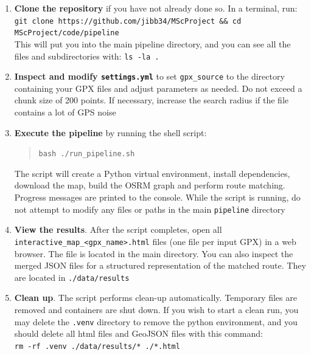\documentclass[11pt,a4paper]{article}
\begin{document}
\begin{enumerate}
	\item \textbf{Clone the repository} if you have not already done so.  In a terminal, run:\\
	      \texttt{\small git clone https://github.com/jibb34/MScProject \&\& cd MScProject/code/pipeline}\\
	      This will put you into the main pipeline directory, and you can see all the files and subdirectories with: \texttt{ls -la .}
	\item \textbf{Inspect and modify \texttt{settings.yml}} to set \texttt{gpx\_source} to the directory containing your GPX files and adjust parameters as needed.  Do not exceed a chunk size of 200 points.  If necessary, increase the search radius if the file contains a lot of GPS noise
	\item \textbf{Execute the pipeline} by running the shell script:
	      \begin{quote}
		      \texttt{bash ./run\_pipeline.sh}
	      \end{quote}
	      The script will create a Python virtual environment, install dependencies, download the map, build the OSRM graph and perform route matching.  Progress messages are printed to the console. While the script is running, do not attempt to modify any files or paths in the main \texttt{pipeline} directory
	\item \textbf{View the results}.  After the script completes, open all \texttt{\small interactive\_map\_\textless gpx\_name\textgreater{}.html} files (one file per input GPX) in a web browser.  The file is located in the main directory.  You can also inspect the merged JSON files for a structured representation of the matched route. They are located in \texttt{./data/results}
	\item \textbf{Clean up}.  The script performs clean-up automatically. Temporary files are removed and containers are shut down. If you wish to start a clean run, you may delete the \texttt{.venv} directory to remove the python environment, and you should delete all html files and GeoJSON files with this command:\\
	      \texttt{rm -rf .venv ./data/results/* ./*.html}
\end{enumerate}
\end{document}
